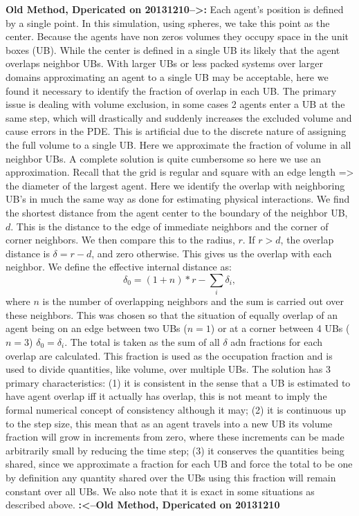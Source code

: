 \documentclass{article}
\begin{document}
\textbf{Old Method, Dpericated on 20131210-->:}
Each agent's position is defined by a single point.  
In this simulation, using spheres, we take this point as the center.
Because the agents have non zeros volumes they occupy space in the unit boxes (UB).
While the center is defined in a single UB its likely that the agent overlaps neighbor UBs.
With larger UBs or less packed systems over larger domains approximating an agent to a single UB may be acceptable,
here we found it necessary to identify the fraction of overlap in each UB.
The primary issue is dealing with volume exclusion,
in some cases 2 agents enter a UB at the same step, 
which will drastically and suddenly increases the excluded volume and cause errors in the PDE.
This is artificial due to the discrete nature of assigning the full volume to a single UB.
Here we approximate the fraction of volume in all neighbor UBs.
A complete solution is quite cumbersome so here we use an approximation.
Recall that the grid is regular and square with an edge length => the diameter of the largest agent.
Here we identify the overlap with neighboring UB's in much the same way as done for estimating physical interactions.
We find the shortest distance from the agent center to the boundary of the neighbor UB, $d$.
This is the distance to the edge of immediate neighbors and the corner of corner neighbors.
We then compare this to the radius, $r$.
If $r>d$, the overlap distance is $\delta = r-d$, and zero otherwise.
This gives us the overlap with each neighbor.  
We define the effective internal distance as:
\begin{equation}
\delta_0 = (1+n)*r - \sum_i \delta_i,
\end{equation}
where $n$ is the number of overlapping neighbors and the sum is carried out over these neighbors.
This was chosen so that the situation of equally overlap of an agent being on an edge between two UBs ($n=1$) or 
at a corner between 4 UBs ($n=3$) $\delta_0=\delta_i$.
The total is taken as the sum of all $\delta$ adn fractions for each overlap are calculated.
This fraction is used as the occupation fraction and is used to divide quantities, like volume, over multiple UBs.
The solution has 3 primary characteristics: 
(1) it is consistent in the sense that a UB is estimated to have agent overlap iff it actually has overlap,
this is not meant to imply the formal numerical concept of consistency although it may;
(2) it is continuous up to the step size, this mean that as an agent travels into a new UB 
its volume fraction will grow in increments from zero, 
where these increments can be made arbitrarily small by reducing the time step;
(3) it conserves the quantities being shared, 
since we approximate a fraction for each UB and force the total to be one by definition 
any quantity shared over the UBs using this fraction will remain constant over all UBs.
We also note that it is exact in some situations as described above.
\textbf{:<--Old Method, Dpericated on 20131210}
\end{document}
